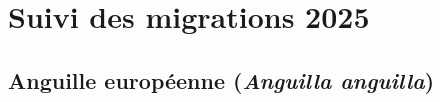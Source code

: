 \documentclass[11pt,twoside]{article}\usepackage[]{graphicx}\usepackage[table]{xcolor}
\begin{document}
% 
% 
% 
% 
% 
% 

\clearpage

\section{Suivi des migrations 2025}

\subsection{Anguille européenne (\textit{Anguilla anguilla})}
\end{document}
